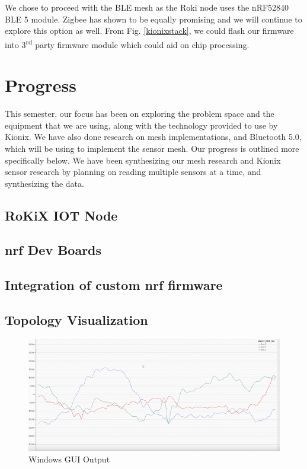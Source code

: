 \documentclass[11pt, a4paper]{article}
\begin{document}
We chose to proceed with the BLE mesh as the Roki node uses the nRF52840 BLE 5 module. Zigbee has shown to be equally promising and we will continue to explore this option as well. From Fig. \ref{kionixstack}, we could flash our firmware into 3\textsuperscript{rd} party firmware module which could aid on chip processing.



\section{Progress}
This semester, our focus has been on exploring the problem space and the equipment that we are using, along with the technology provided to use by Kionix. We have also done research on mesh implementations, and Bluetooth 5.0, which will be using to implement the sensor mesh. Our progress is outlined more specifically below. We have been synthesizing our mesh research and Kionix sensor research by planning on reading multiple sensors at a time, and synthesizing the data. 

\subsection{RoKiX IOT Node}


\subsection{nrf Dev Boards}

\subsection{Integration of custom nrf firmware}

\subsection{Topology Visualization}

	\begin{figure}[!h]
	\begin{adjustwidth}{-1.5cm}{}
	\begin{center}
		\includegraphics[scale=0.99]{Images/windowsgui}
	\end{center}
\end{adjustwidth}
\caption{Windows GUI Output}
\label{windowsgui}
\end{figure}
\end{document}
